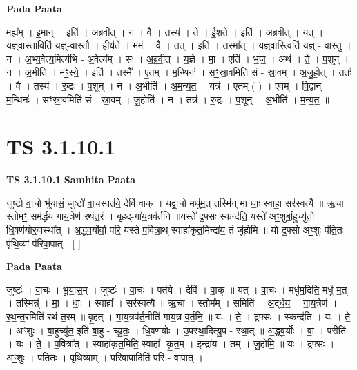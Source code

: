 \documentclass[17pt]{extarticle}
\begin{document}
\textbf{Pada Paata} \newline

मह्य᳚म् । इ॒मान् । इति॑ । अ॒ब्र॒वी॒त् । न । वै । तस्य॑ । ते । ई॒श॒ते॒ । इति॑ । अ॒ब्र॒वी॒त् । यत् । य॒ज्ञ्॒वा॒स्ताविति॑ यज्ञ्-वा॒स्तौ । हीय॑ते । मम॑ । वै । तत् । इति॑ । तस्मा᳚त् । य॒ज्ञ्॒वा॒स्त्विति॑ यज्ञ् - वा॒स्तु । न । अ॒भ्य॒वेत्य॒मित्य॑भि - अ॒वेत्य᳚म् । सः । अ॒ब्र॒वी॒त् । य॒ज्ञे । मा॒ । एति॑ । भ॒ज॒ । अथ॑ । ते॒ । प॒शून् । न । अ॒भीति॑ । मꣳ॒॒स्ये॒ । इति॑ । तस्मै᳚ । ए॒तम् । म॒न्थिनः॑ । सꣳ॒॒स्रा॒वमिति॑ सं - स्रा॒वम् । अ॒जु॒हो॒त् । ततः॑ । वै । तस्य॑ । रु॒द्रः । प॒शून् । न । अ॒भीति॑ । अ॒म॒न्य॒त॒ । यत्र॑ । ए॒तम् ( ) । ए॒वम् । वि॒द्वान् । म॒न्थिनः॑ । सꣳ॒॒स्रा॒वमिति॑ सं - स्रा॒वम् । जु॒होति॑ । न । तत्र॑ । रु॒द्रः । प॒शून् । अ॒भीति॑ । म॒न्य॒त॒ ॥  \newline




\section*{ TS 3.1.10.1 }

\textbf{TS 3.1.10.1 } \newline
\textbf{Samhita Paata} \newline

जुष्टो॑ वा॒चो भू॑यासं॒ जुष्टो॑ वा॒चस्पत॑ये॒ देवि॑ वाक् । यद्वा॒चो मधु॑म॒त् तस्मि॑न् मा धाः॒ स्वाहा॒ सर॑स्वत्यै ॥ ऋ॒चा स्तोमꣳ॒॒ सम॑र्द्धय गाय॒त्रेण॑ रथंत॒रं । बृ॒हद्-गा॑य॒त्रव॑र्तनि ॥यस्ते᳚ द्र॒फ्सः स्कन्द॑ति॒ यस्ते॑ अꣳ॒॒शुर्बा॒हुच्यु॑तो धि॒षण॑योरु॒पस्था᳚त् । अ॒द्ध्व॒र्योर्वा॒ परि॒ यस्ते॑ प॒वित्रा॒थ् स्वाहा॑कृत॒मिन्द्रा॑य॒ तं जु॑होमि ॥ यो द्र॒फ्सो अꣳ॒॒शुः प॑ति॒तः पृ॑थि॒व्यां प॑रिवा॒पात् - [  ] \newline

\textbf{Pada Paata} \newline

जुष्टः॑ । वा॒चः । भू॒या॒स॒म् । जुष्टः॑ । वा॒चः । पत॑ये । देवि॑ । वा॒क् ॥ यत् । वा॒चः । मधु॑म॒दिति॒ मधु॑-म॒त् । तस्मिन्न्॑ । मा॒ । धाः॒ । स्वाहा᳚ । सर॑स्वत्यै ॥ ऋ॒चा । स्तोम᳚म् । समिति॑ । अ॒द्‌र्ध॒य॒ । गा॒य॒त्रेण॑ । र॒थ॒न्त॒रमिति॑ रथं-त॒रम् ॥ बृ॒हत् । गा॒य॒त्रव॑र्त॒नीति॑ गाय॒त्र-व॒र्त॒नि॒ ॥ यः । ते॒ । द्र॒फ्सः । स्कन्द॑ति । यः । ते॒ । अꣳ॒॒शुः । बा॒हुच्यु॑त॒ इति॑ बा॒हु - च्यु॒तः॒ । धि॒षण॑योः । उ॒पस्था॒दित्यु॒प - स्था॒त् ॥ अ॒द्ध्व॒र्योः । वा॒ । परीति॑ । यः । ते॒ । प॒वित्रा᳚त् । स्वाहा॑कृत॒मिति॒ स्वाहा᳚ -कृ॒त॒म् । इन्द्रा॑य । तम् । जु॒हो॒मि॒ ॥ यः । द्र॒फ्सः । अꣳ॒॒शुः । प॒ति॒तः । पृ॒थि॒व्याम् । प॒रि॒वा॒पादिति॑ परि - वा॒पात् ।  \newline
\end{document}
